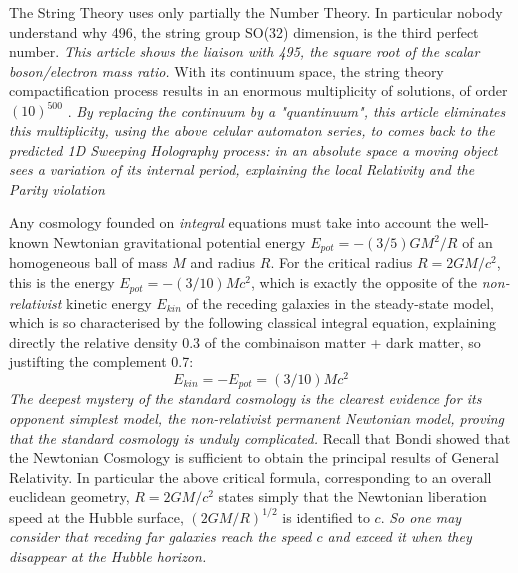 \documentclass[a4paper,9pt]{article}
\begin{document}
The String Theory uses only partially the Number Theory. In particular nobody understand why 496, the string group SO(32) dimension, is the third perfect number. \textit {This article shows the liaison with 495, the square root of the scalar boson/electron mass ratio.} With its continuum space, the string theory compactification process results in an enormous multiplicity of solutions, of order $(10)^{500}$ \cite{Schwarz}. \textit {By replacing the continuum by a "quantinuum", this article eliminates this multiplicity, using the above celular automaton series, to comes back to the predicted 1D Sweeping Holography process: in an absolute space a moving object sees a variation of its internal period, explaining the local Relativity and the Parity violation \cite{Sanchez1} }     

Any cosmology founded on \textit{integral} equations must take into account the well-known Newtonian gravitational potential energy $ E_{pot} = -(3/5)GM^2/R$ of an homogeneous ball of mass $M$ and radius $R$. For the critical radius $R = 2GM/c^2$, this is the energy $ E_{pot} = -(3/10)Mc^2$, which is exactly the opposite of the \textit{non-relativist} kinetic energy $E_{kin}$ of the receding galaxies in the steady-state model, \cite {Sanchez2} which is so characterised by the following classical integral equation, explaining directly the relative density 0.3 of the combinaison matter + dark matter, so justifting the complement 0.7: 
\begin{equation}
E_{kin} = - E_{pot} = (3/10) Mc^2 
 \end{equation}
\textit {The deepest mystery of the standard cosmology is the clearest evidence for its opponent simplest model, the non-relativist permanent Newtonian model, proving that the standard cosmology is unduly complicated.} Recall that Bondi \cite {Bondi} showed that the Newtonian Cosmology is sufficient to obtain the principal results of General Relativity. In particular the above critical formula, corresponding to an overall euclidean geometry, $R = 2GM/c^2$ states simply that the Newtonian liberation speed at the Hubble surface, $(2GM/R)^{1/2}$ is identified to $c$. \textit {So one may consider that receding far galaxies reach the speed $c$ and exceed it when they disappear at the Hubble horizon.}
\end{document}
